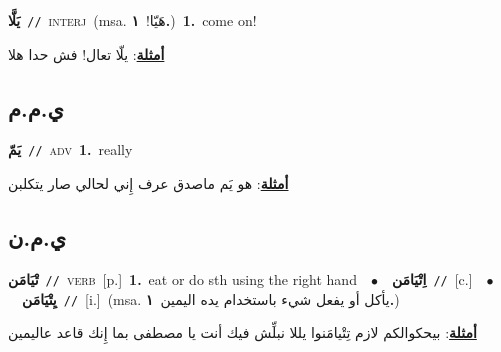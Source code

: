 \documentclass[10pt,a4paper,twoside]{article} %
\begin{document}
\begin{multicols}{2}
{\setlength\topsep{0pt}\textbf{\foreignlanguage{arabic}{يَلَّا}}\ {\color{gray}\texttt{//}\color{black}}\ \textsc{interj}\ \color{gray}(msa. \foreignlanguage{arabic}{هَيّا!}~\foreignlanguage{arabic}{\textbf{١.}})\color{black}\ \textbf{1.}~come on!\  \begin{flushright}\color{gray}\foreignlanguage{arabic}{\textbf{\underline{\foreignlanguage{arabic}{أمثلة}}}: يلّا تعال! فش حدا هلا}\end{flushright}\color{black}} \vspace{2mm}

\vspace{-3mm}
\subsection*{\color{blue}\foreignlanguage{arabic}{ي.م.م}\color{blue}{ (ntws)}} 

{\setlength\topsep{0pt}\textbf{\foreignlanguage{arabic}{يَمّ}}\ {\color{gray}\texttt{//}\color{black}}\ \textsc{adv}\ \textbf{1.}~really\  \begin{flushright}\color{gray}\foreignlanguage{arabic}{\textbf{\underline{\foreignlanguage{arabic}{أمثلة}}}: هو يَم ماصدق عرف إِني لحالي صار يتكلبن}\end{flushright}\color{black}} \vspace{2mm}

\vspace{-3mm}
\subsection*{\color{blue}\foreignlanguage{arabic}{ي.م.ن}\color{blue}{}} 

{\setlength\topsep{0pt}\textbf{\foreignlanguage{arabic}{تْيَامَن}}\ {\color{gray}\texttt{//}\color{black}}\ \textsc{verb}\ [p.]\ \textbf{1.}~eat or do sth using the right hand\ \ $\bullet$\ \ \setlength\topsep{0pt}\textbf{\foreignlanguage{arabic}{اِتْيَامَن}}\ {\color{gray}\texttt{//}\color{black}}\ [c.]\ \ $\bullet$\ \ \setlength\topsep{0pt}\textbf{\foreignlanguage{arabic}{يِتْيَامَن}}\ {\color{gray}\texttt{//}\color{black}}\ [i.]\ \color{gray}(msa. \foreignlanguage{arabic}{يأكل أو يفعل شيء باستخدام يده اليمين}~\foreignlanguage{arabic}{\textbf{١.}})\color{black}\  \begin{flushright}\color{gray}\foreignlanguage{arabic}{\textbf{\underline{\foreignlanguage{arabic}{أمثلة}}}: بيحكوالكم لازم تِتْيامَنوا يللا نبلِّش فيك أنت يا مصطفى بما إِنك قاعد عاليمين}\end{flushright}\color{black}} \vspace{2mm}


\end{multicols}
\end{document}
